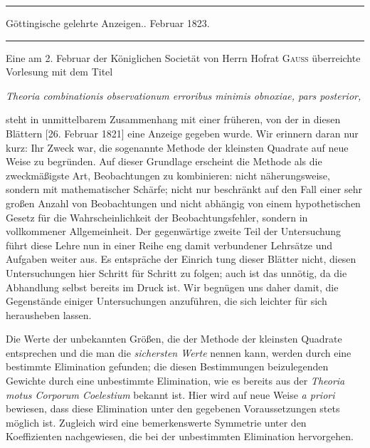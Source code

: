 \par\bigskip
\begin{center}
\rule{.88\textwidth}{.3pt}\par
Göttingische gelehrte Anzeigen.. Februar 1823.\par
\rule{.88\textwidth}{.3pt}
\end{center}

Eine am 2. Februar der Königlichen Societät von Herrn Hofrat \textsc{Gauss} überreichte Vorlesung mit dem Titel
\begin{center}
\textit{Theoria combinationis observationum erroribus minimis obnoxiae, pars posterior,}
\end{center}
\noindent steht in unmittelbarem Zusammenhang mit einer früheren, von der in diesen Blättern [26. Februar 1821] eine Anzeige gegeben wurde. Wir erinnern daran nur kurz: Ihr Zweck war, die sogenannte Methode der kleinsten Quadrate auf neue Weise zu begründen. Auf dieser Grundlage erscheint die Methode als die zweckmäßigste Art, Beobachtungen zu kombinieren: nicht näherungsweise, sondern mit mathematischer Schärfe; nicht nur beschränkt auf den Fall einer sehr großen Anzahl von Beobachtungen und nicht abhängig von einem hypothetischen Gesetz für die Wahrscheinlichkeit der Beobachtungsfehler, sondern in vollkommener Allgemeinheit. Der gegenwärtige zweite Teil der Untersuchung führt diese Lehre nun in einer Reihe eng damit verbundener Lehrsätze und Aufgaben weiter aus. Es entspräche der Einrich%
tung dieser Blätter nicht, diesen Untersuchungen hier Schritt für Schritt zu folgen; auch ist das unnötig, da die Abhandlung selbst bereits im Druck ist. Wir begnügen uns daher damit, die Gegenstände einiger Untersuchungen anzuführen, die sich leichter für sich herausheben lassen.

Die Werte der unbekannten Größen, die der Methode der kleinsten Quadrate entsprechen und die man die \textit{sichersten Werte} nennen kann, werden durch eine bestimmte Elimination gefunden; die diesen Bestimmungen beizulegenden Gewichte durch eine unbestimmte Elimination, wie es bereits aus der \textit{Theoria motus Corporum Coelestium} bekannt ist. Hier wird auf neue Weise \textit{a priori} bewiesen, dass diese Elimination unter den gegebenen Voraussetzungen stets möglich ist. Zugleich wird eine bemerkenswerte Symmetrie unter den Koeffizienten nachgewiesen, die bei der unbestimmten Elimination hervorgehen.

